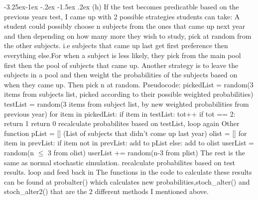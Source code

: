 \documentclass[10pt]{article} %
\makeatletter
\renewcommand\subsection{\@startsection{subsection}{2}{\z@}%
                                     {-3.25ex\@plus -1ex \@minus -.2ex}%
                                     {-1.5ex \@plus .2ex}%
                                     {\normalfont\large\bfseries}}
\makeatother
\begin{document}
\subsection{(h)}
If the test becomes predicatble based on the previous years test, I came up with 2 possible strategies students can take:
\newline
A student could possibly choose n subjects from the ones that came up next year and then depending on how many more they wish to study, pick at random from the other subjects. i.e subjects that came up last get first preference then everything else.For when a subject is less likely, they pick from the main pool first then the pool of subjects that came up.
\newline
Another strategy is to leave the subjects in a pool and then weight the probabilities of the subjects based on when they came up. Then pick n at random.
\newline
Pseudocode:
\newline
pickedList = random(3 items from subjects list, picked according to their possible weighted probabilities)
\newline
testList  =  random(3 items from subject list, by new weighted probabilities from previous year)
\newline for item in pickedList:
\newline
	\indent if item in testList: tot++
	\newline
	\indent if tot == 2: return 1
	\newline
return 0 
\newline recalculate probabilites based on testList, loop again
\newline
Other function\newline
pList = [] (List of subjects that didn't come up last year)\newline
olist = []
for item in prevList:
\newline \indent if item not in prevList: add to pList \newline
\indent else: add to olist \newline
userList = random(n \(\le\) 3 from olist) \newline
userList += random(n-3 from plist) \newline
The rest is the same as  normal stochastic simulation.\newline
recalculate probabilites based on test results. loop and feed back in\newline
The functions in the code to calculate these results can be found at probalter() which calculates new probabilities,stoch\_alter() and stoch\_alter2() that are the 2 different methods I mentioned above.\newline
\end{document}
